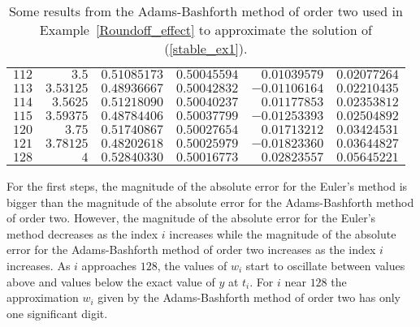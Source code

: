 \begin{egg}
\begin{table}[t]
\begin{center}
{\begin{tabular}{crrrrr}
$112$ & $3.5$ & $0.51085173$ & $0.50045594$ & $0.01039579$ & $0.02077264$ \\
$113$ & $3.53125$ & $0.48936667$ & $0.50042832$ & $-0.01106164$ &
$0.02210435$ \\
$114$ & $3.5625$ & $0.51218090$ & $0.50040237$ & $0.01177853$ & $0.02353812$ \\
$115$ & $3.59375$ & $0.48784406$ & $0.50037799$ & $-0.01253393$ &
$0.02504892$ \\
$120$ & $3.75$ & $0.51740867$ & $0.50027654$ & $0.01713212$ & $0.03424531$ \\
$121$ & $3.78125$ & $0.48202618$ & $0.50025979$ & $-0.01823360$ &
$0.03644827$ \\
$128$ & $4$ & $0.52840330$ & $0.50016773$ & $0.02823557$ & $0.05645221$ \\
\hline
\end{tabular}
}
\end{center}
\caption[Example for the Adams-Bashforth method of order two]{Some
results from the Adams-Bashforth method of order two used in
Example~\ref{Roundoff_effect} to approximate the solution of
(\ref{stable_ex1}). \label{STAB_ADBF_twoS}}
\end{table}

For the first steps, the magnitude of the absolute error for the Euler's
method is bigger than the magnitude of the absolute error for the
Adams-Bashforth method of order two.  However, the magnitude of the
absolute error for the Euler's method decreases as the index $i$
increases while the magnitude of the absolute error for the
Adams-Bashforth method of order two increases as the index $i$ increases.
As $i$ approaches $128$, the values of $w_i$ start to oscillate
between values above and values below the exact value of $y$ at $t_i$.
For $i$ near $128$ the approximation $w_i$ given by the
Adams-Bashforth method of order two has only one significant digit.



\end{egg}
